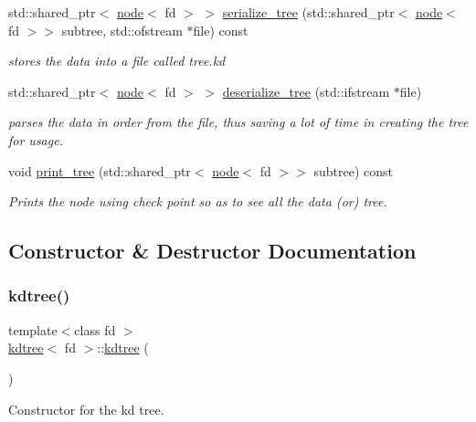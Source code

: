\begin{DoxyCompactItemize}
std\+::shared\+\_\+ptr$<$ \hyperlink{classnode}{node}$<$ fd $>$ $>$ \hyperlink{classkdtree_a4e8a0ae6cd7464aa0f4ef0f9fb12d211}{serialize\+\_\+tree} (std\+::shared\+\_\+ptr$<$ \hyperlink{classnode}{node}$<$ fd $>$$>$ subtree, std\+::ofstream $\ast$file) const
\begin{DoxyCompactList}\small\item\em stores the data into a file called \textquotesingle{}tree.\+kd\textquotesingle{} \end{DoxyCompactList}\item 
std\+::shared\+\_\+ptr$<$ \hyperlink{classnode}{node}$<$ fd $>$ $>$ \hyperlink{classkdtree_a530cb40f47ab46fb97125028da30744d}{deserialize\+\_\+tree} (std\+::ifstream $\ast$file)
\begin{DoxyCompactList}\small\item\em parses the data in order from the file, thus saving a lot of time in creating the tree for usage. \end{DoxyCompactList}\item 
void \hyperlink{classkdtree_a21c911f32cabf57ea36f5e8083d53532}{print\+\_\+tree} (std\+::shared\+\_\+ptr$<$ \hyperlink{classnode}{node}$<$ fd $>$$>$ subtree) const
\begin{DoxyCompactList}\small\item\em Prints the node using check point so as to see all the data (or) tree. \end{DoxyCompactList}\end{DoxyCompactItemize}


\subsection{Constructor \& Destructor Documentation}
\mbox{\label{classkdtree_a938fa159f9e1088db61c8fc34b2d31c9}} 
\subsubsection{\texorpdfstring{kdtree()}{kdtree()}}
{\footnotesize\ttfamily template$<$class fd $>$ \\
\hyperlink{classkdtree}{kdtree}$<$ fd $>$\+::\hyperlink{classkdtree}{kdtree} (\begin{DoxyParamCaption}{ }\end{DoxyParamCaption})}



Constructor for the kd tree. 

